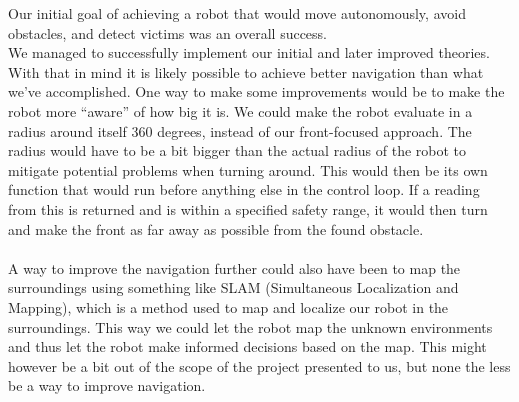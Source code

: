 \documentclass[conference]{IEEEtran}
\begin{document}
Our initial goal of achieving a robot that would move autonomously, avoid obstacles, and detect 
victims was an overall success. \\
We managed to successfully implement our initial and later improved theories. 
With that in mind it is likely possible to achieve better navigation than what we've accomplished. 
One way to make some improvements would be to make the robot more “aware” of how big it is. We could make 
the robot evaluate in a radius around itself 360 degrees, instead of our front-focused approach. 
The radius would have to be a bit bigger than the actual radius of the robot to mitigate potential problems when turning around. 
This would then be its own function that would run before anything else in the control loop. 
If a reading from this is returned and is within a specified safety range, it would then turn and make the 
front as far away as possible from the found obstacle. \\\\
A way to improve the navigation further could also have been to map the surroundings using something like 
SLAM (Simultaneous Localization and Mapping), which is a method used to map and localize our robot in the surroundings. 
This way we could let the robot map the unknown environments and thus let the robot make informed decisions based on the map. 
This might however be a bit out of the scope of the project presented to us, but none the less be a way to improve navigation. 
\end{document}
